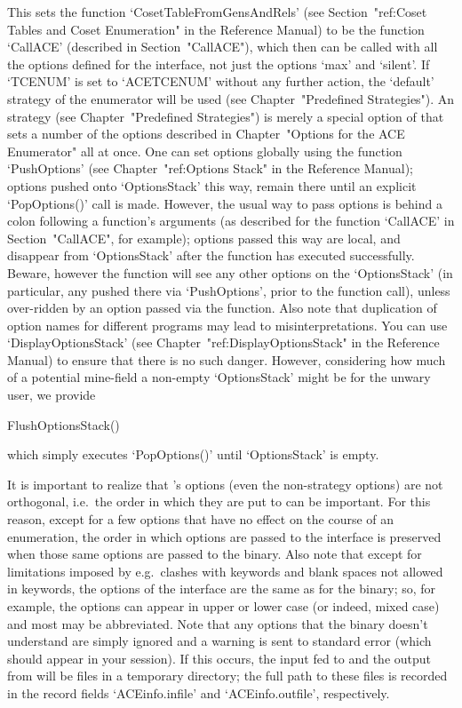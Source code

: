 This    sets    the    function    `CosetTableFromGensAndRels'    (see
Section~"ref:Coset  Tables  and   Coset  Enumeration"  in  the  {\GAP}
Reference  Manual)   to  be  the  function   `CallACE'  (described  in
Section~"CallACE"),  which then  can be  called with  all  the options
defined  for the  {\ACE} interface,  not  just the  options `max'  and
`silent'.  If  `TCENUM' is  set  to  `ACETCENUM'  without any  further
action, the `default'  strategy of the {\ACE} enumerator  will be used
(see  Chapter~"Predefined  Strategies").    An  {\ACE}  strategy  (see
Chapter~"Predefined Strategies") is merely  a special option of {\ACE}
that sets  a number of  the options described in  Chapter~"Options for
the ACE  Enumerator" all at once.  One can set  options globally using
the  function `PushOptions'  (see Chapter~"ref:Options  Stack"  in the
{\GAP} Reference Manual); options pushed onto `OptionsStack' this way,
remain there until an  explicit `PopOptions()' call is made.  However,
the usual way to pass options is behind a colon following a function's
arguments    (as   described   for    the   function    `CallACE'   in
Section~"CallACE", for  example); options  passed this way  are local,
and  disappear from  `OptionsStack'  after the  function has  executed
successfully.  Beware, however the function will see any other options
on   the  `OptionsStack'   (in  particular,   any  pushed   there  via
`PushOptions', prior  to the function call), unless  over-ridden by an
option passed via the function.   Also note that duplication of option
names for different programs  may lead to misinterpretations.  You can
use  `DisplayOptionsStack'  (see Chapter~"ref:DisplayOptionsStack"  in
the {\GAP} Reference  Manual) to ensure that there  is no such danger.
However, considering  how much of  a potential mine-field  a non-empty
`OptionsStack' might be for the unwary user, we provide

\>FlushOptionsStack()

which  simply  executes `PopOptions()' until `OptionsStack' is empty.

It is important to realize that {\ACE}'s options (even the non-strategy 
options) are not orthogonal, i.e.\ the order in which they are put to
{\ACE} can be important.  For this reason,  except for a  few options
that have no effect on the course of an  enumeration,  the  order  in
which  options  are passed to the {\ACE} interface is preserved  when 
those same options are passed to the {\ACE} binary.  Also  note  that
except for limitations imposed  by {\GAP}  e.g.\ clashes  with {\GAP}
keywords and blank spaces not allowed in keywords, the options of the
{\ACE} interface are the same as for the binary; so, for example, the
options can appear in upper or lower case (or indeed, mixed case) and
most may be abbreviated. Note that any options that the {\ACE} binary
doesn't  understand  are  simply  ignored  and  a  warning is sent to 
standard error (which should appear in your {\GAP} session).  If this
occurs,  the  input fed to  {\ACE} and the output from {\ACE} will be
files in a  temporary directory;  the full path  to  these  files  is
recorded in the record fields `ACEinfo.infile' and `ACEinfo.outfile',
respectively.

